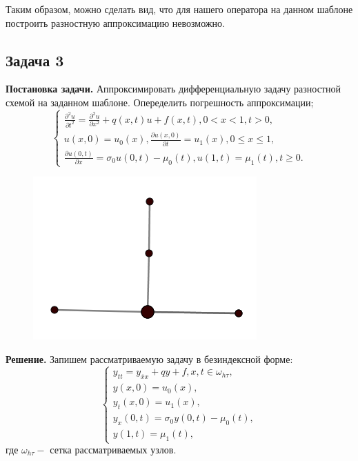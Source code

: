 \documentclass[11pt]{article}
\begin{document}
Таким образом, можно сделать вид, что для нашего оператора на данном шаблоне построить разностную аппроксимацию невозможно.
\newpage
\subsection*{Задача 3}
\textbf{Постановка задачи.} Аппроксимировать дифференциальную задачу разностной схемой на заданном шаблоне.
Опеределить погрешность аппроксимации;
$$\begin{cases}
    \frac{\partial^2 u}{\partial t^2}=\frac{\partial^2 u}{\partial x^2}+q(x,t)u+f(x,t), 0<x<1,t>0,\\
    u(x,0)=u_0(x),\frac{\partial u(x,0)}{\partial t}=u_1(x), 0 \leq x \leq 1,\\
    \frac{\partial u(0,t)}{\partial x}=\sigma_0 u(0,t)-\mu_0(t),u(1,t)=\mu_1(t),t\geq0.
\end{cases}$$
\begin{figure}
    \centering
    \includegraphics[width=0.35\linewidth]{image3.png}
\end{figure}
\textbf{Решение.} Запишем рассматриваемую задачу в безиндексной форме:
$$\begin{cases}
    y_{tt}=y_{\overline{x} x}+qy+f, x,t\in \omega_{h\tau},\\
    y(x,0)=u_0(x),\\
    y_t(x,0)=u_1(x), \\
    y_x(0,t)=\sigma_0 y(0,t)-\mu_0(t),\\
    y(1,t)=\mu_1(t),
\end{cases}$$
где $\omega_{h\tau} -$ сетка рассматриваемых узлов. 
\end{document}
